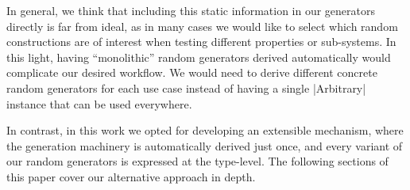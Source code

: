 %
In general, we think that including this static information in our generators
directly is far from ideal, as in many cases we would like to select which
random constructions are of interest when testing different properties or
sub-systems.
%
In this light, having ``monolithic'' random generators derived automatically
would complicate our desired workflow.
%
We would need to derive different concrete random generators for each use case
instead of having a single |Arbitrary| instance that can be used everywhere.


In contrast, in this work we opted for developing an extensible mechanism, where
the generation machinery is automatically derived just once, and every variant
of our random generators is expressed at the type-level.
%
The following sections of this paper cover our alternative approach in depth.
